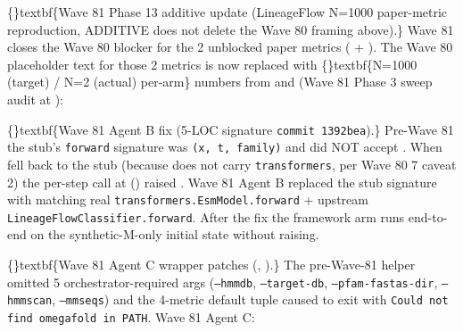 \documentclass{article}
\begin{document}
\{\}textbf\{Wave 81 Phase 13 additive update (LineageFlow N=1000 paper-metric reproduction, ADDITIVE  does not delete the Wave 80 framing above).\} Wave 81 closes the Wave 80  blocker for the 2 unblocked paper metrics ( + ). The Wave 80 placeholder text for those 2 metrics is now replaced with \{\}textbf\{N=1000 (target) / N=2 (actual) per-arm\} numbers from  and  (Wave 81 Phase 3 sweep audit at ):

\{\}textbf\{Wave 81 Agent B fix (5-LOC  signature  \texttt{commit 1392bea}).\} Pre-Wave 81 the stub's \texttt{forward} signature was \texttt{(x, t, family)} and did NOT accept . When  fell back to the stub (because  does not carry \texttt{transformers}, per Wave 80 7 caveat 2) the per-step call at  () raised . Wave 81 Agent B replaced the stub signature with  matching real \texttt{transformers.EsmModel.forward} + upstream \texttt{LineageFlowClassifier.forward}. After the fix the framework arm runs end-to-end on the synthetic-M-only initial state without raising.

\{\}textbf\{Wave 81 Agent C wrapper patches (, ).\} The pre-Wave-81  helper omitted 5 orchestrator-required args (\texttt{--hmmdb}, \texttt{--target-db}, \texttt{--pfam-fastas-dir}, \texttt{--hmmscan}, \texttt{--mmseqs}) and the 4-metric default tuple caused  to exit with \texttt{Could not find omegafold in PATH}. Wave 81 Agent C:
\end{document}
